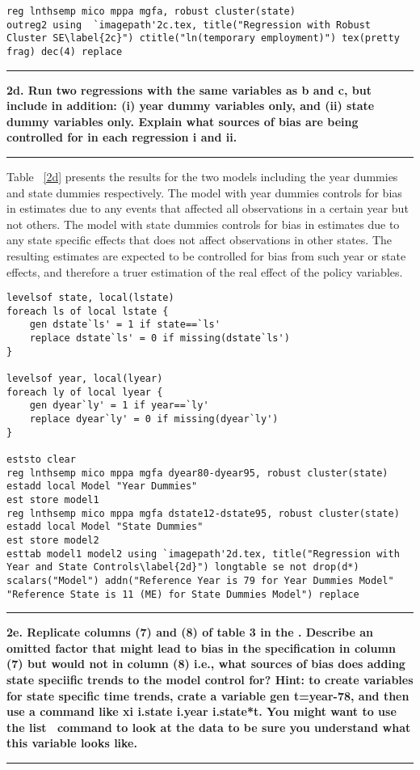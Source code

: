 \documentclass[12pt]{article}
\newcommand\question[1]{\vspace{1em}\hrule\vspace{1em}\textbf{#1}\vspace{1em}\hrule\vspace{1em}}
\begin{document}
\begin{lstlisting}
reg lnthsemp mico mppa mgfa, robust cluster(state)
outreg2 using  `imagepath'2c.tex, title("Regression with Robust Cluster SE\label{2c}") ctitle("ln(temporary employment)") tex(pretty frag) dec(4) replace
\end{lstlisting}

\newpage
\question{2d. Run two regressions with the same variables as b and c, but include in addition: (i) year dummy variables only, and (ii) state dummy variables only. Explain what sources of bias are being controlled for in each regression i and ii.}

\noindent Table ~\ref{2d} presents the results for the two models including the year dummies and state dummies respectively. The model with year dummies controls for bias in estimates due to any events that affected all observations in a certain year but not others. The model with state dummies controls for bias in estimates due to any state specific effects that does not affect observations in other states. The resulting estimates are expected to be controlled for bias from such year or state effects, and therefore a truer estimation of the real effect of the policy variables.




\begin{lstlisting}
levelsof state, local(lstate)
foreach ls of local lstate {
	gen dstate`ls' = 1 if state==`ls'
	replace dstate`ls' = 0 if missing(dstate`ls')
}

levelsof year, local(lyear)
foreach ly of local lyear {
	gen dyear`ly' = 1 if year==`ly'
	replace dyear`ly' = 0 if missing(dyear`ly')
}

eststo clear
reg lnthsemp mico mppa mgfa dyear80-dyear95, robust cluster(state)
estadd local Model "Year Dummies"
est store model1
reg lnthsemp mico mppa mgfa dstate12-dstate95, robust cluster(state)
estadd local Model "State Dummies"
est store model2
esttab model1 model2 using `imagepath'2d.tex, title("Regression with Year and State Controls\label{2d}") longtable se not drop(d*) scalars("Model") addn("Reference Year is 79 for Year Dummies Model" "Reference State is 11 (ME) for State Dummies Model") replace
\end{lstlisting}



\newpage
\question{2e. Replicate columns (7) and (8) of table 3 in the \cite{Autor2003}. Describe an omitted factor that might lead to bias in the specification in column (7) but would not in column (8) i.e., what sources of bias does adding state speciific trends to the model control for? Hint: to create variables for state specific time trends, crate a variable gen t=year-78, and then use a command like xi i.state i.year i.state*t. You might want to use the \textquotesingle list \textquotesingle \ command to look at the data to be sure you understand what this variable looks like. }
\end{document}
